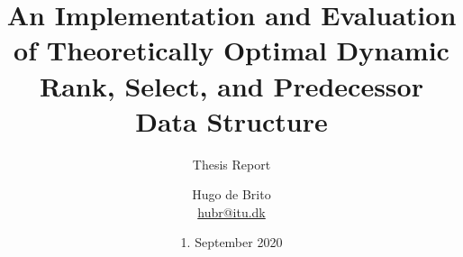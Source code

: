 
\titlehead{
    \texttt{[image: 03\_GraphicFiles/logo\_en.png]}
}

\subject{MSc Software Development}

\title{An Implementation and Evaluation of Theoretically Optimal Dynamic Rank, Select, and Predecessor Data Structure}

\subtitle{Thesis Report}

\author{Hugo de Brito\\
\href{mailto:hubr@itu.dk}{{\ttfamily hubr@itu.dk}}}

\date{1. September 2020}

\publishers{{\small Supervisor}\\Holger Dell\\
\href{mailto:hold@itu.dk}{{\ttfamily hold@itu.dk}}}

\maketitle